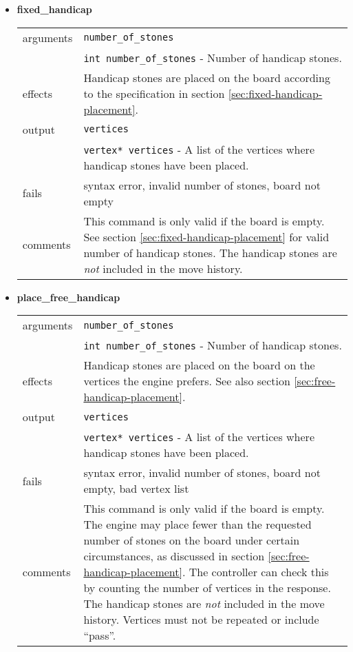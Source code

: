 \documentclass[a4paper]{article}
\begin{document}
\begin{itemize}
\item \textbf{fixed\_handicap} \\
  \begin{tabularx}{\linewidth}{lX}
    arguments & \texttt{number\_of\_stones} \\
    & \texttt{int number\_of\_stones}  - Number of handicap stones. \\
    effects &   Handicap stones are placed on the board according to the
                specification in section \ref{sec:fixed-handicap-placement}.\\
    output &    \texttt{vertices} \\
    & \texttt{vertex* vertices}  - A list of the vertices where
                handicap stones have been placed. \\
    fails &     syntax error, invalid number of stones, board not empty \\
    comments &  This command is only valid if the board is empty.
                See section \ref{sec:fixed-handicap-placement} for
                valid number of handicap stones. 
                The handicap stones are \emph{not} included in the move
                history.
  \end{tabularx}

\newpage
\item \textbf{place\_free\_handicap} \\
  \begin{tabularx}{\linewidth}{lX}
    arguments & \texttt{number\_of\_stones} \\
    & \texttt{int number\_of\_stones} - Number of handicap stones. \\
    effects &   Handicap stones are placed on the board on the vertices the 
                engine prefers. See also section
                \ref{sec:free-handicap-placement}. \\ 
    output &    \texttt{vertices} \\
    & \texttt{vertex* vertices}  - A list of the vertices where
                handicap stones have been placed.\\
    fails &     syntax error, invalid number of stones, board not
                empty, bad vertex list \\
    comments &  This command is only valid if the board is empty.
                The engine may place fewer than the requested number of
                stones on the board under certain circumstances, as
                discussed in section \ref{sec:free-handicap-placement}.
                The controller can check this by 
                counting the number of vertices in the response.
                The handicap stones are \emph{not} included in the move
                history. Vertices must not be repeated or include ``pass''. \\
  \end{tabularx}


\end{itemize}
\end{document}

